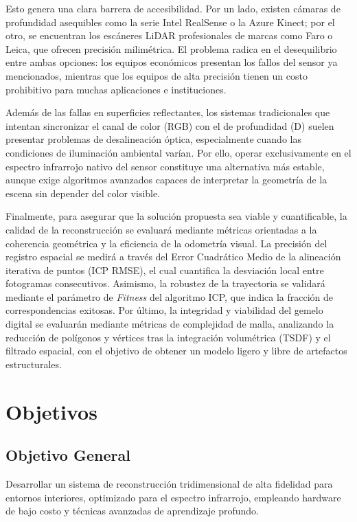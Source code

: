 \documentclass[12pt, a4, twoside, openany]{report}
\begin{document}
Esto genera una clara barrera de accesibilidad. Por un lado, existen cámaras de profundidad asequibles como la serie Intel RealSense o la Azure Kinect; por el otro, se encuentran los escáneres LiDAR profesionales de marcas como Faro o Leica, que ofrecen precisión milimétrica. El problema radica en el desequilibrio entre ambas opciones: los equipos económicos presentan los fallos del sensor ya mencionados, mientras que los equipos de alta precisión tienen un costo prohibitivo para muchas aplicaciones e instituciones.

Además de las fallas en superficies reflectantes, los sistemas tradicionales que intentan sincronizar el canal de color (RGB) con el de profundidad (D) suelen presentar problemas de desalineación óptica, especialmente cuando las condiciones de iluminación ambiental varían. Por ello, operar exclusivamente en el espectro infrarrojo nativo del sensor constituye una alternativa más estable, aunque exige algoritmos avanzados capaces de interpretar la geometría de la escena sin depender del color visible.

Finalmente, para asegurar que la solución propuesta sea viable y cuantificable, la calidad de la reconstrucción se evaluará mediante métricas orientadas a la coherencia geométrica y la eficiencia de la odometría visual. La precisión del registro espacial se medirá a través del Error Cuadrático Medio de la alineación iterativa de puntos (ICP RMSE), el cual cuantifica la desviación local entre fotogramas consecutivos. Asimismo, la robustez de la trayectoria se validará mediante el parámetro de \textit{Fitness} del algoritmo ICP, que indica la fracción de correspondencias exitosas. Por último, la integridad y viabilidad del gemelo digital se evaluarán mediante métricas de complejidad de malla, analizando la reducción de polígonos y vértices tras la integración volumétrica (TSDF) y el filtrado espacial, con el objetivo de obtener un modelo ligero y libre de artefactos estructurales.

\section{Objetivos}

\subsection{Objetivo General}

Desarrollar un sistema de reconstrucción tridimensional de alta fidelidad para entornos interiores, optimizado para el espectro infrarrojo, empleando hardware de bajo costo y técnicas avanzadas de aprendizaje profundo.
\end{document}
